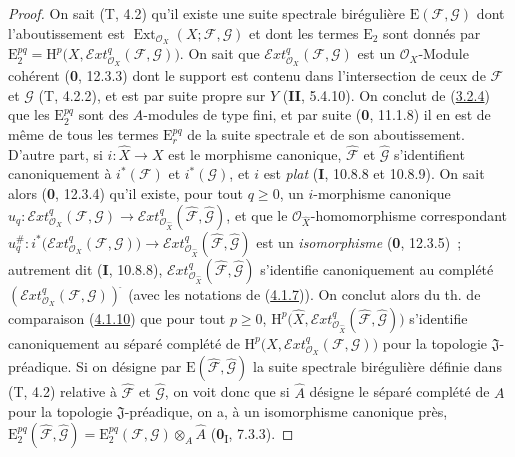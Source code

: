 \begin{proof}
On sait (T, 4.2) qu'il existe une suite spectrale birégulière
$\mathrm E(\mathcal F,\mathcal G)$ dont l'aboutissement est
$\operatorname{Ext}_{\mathcal O_X}(X;\mathcal F,\mathcal G)$ et dont les termes
$\mathrm E_2$ sont donnés par
$\mathrm E_2^{pq}=\mathrm H^p\bigl(X,
\mathcal{E}\!xt^q_{\mathcal O_X}(\mathcal F,\mathcal G)\bigr)$.
On sait que $\mathcal{E}\!xt^q_{\mathcal O_X}(\mathcal F,\mathcal G)$ est un
$\mathcal O_X$-Module cohérent (\textbf{0}, 12.3.3) dont le support est contenu dans
l'intersection de ceux de $\mathcal F$ et $\mathcal G$ (T, 4.2.2), et est
par suite propre sur $Y$ (\textbf{II}, 5.4.10). On conclut de
(\hyperref[III.3.2.4-fr]{3.2.4}) que les $\mathrm E_2^{pq}$ sont des
$A$-modules de type fini, et par suite (\textbf{0}, 11.1.8) il en est de même de tous
les termes $\mathrm E_r^{pq}$ de la suite spectrale et de son aboutissement.
D'autre part, si $i:\widehat X\to X$ est le morphisme canonique,
$\widehat{\mathcal F}$ et $\widehat{\mathcal G}$ s'identifient canoniquement
à $i^*(\mathcal F)$ et $i^*(\mathcal G)$, et $i$ est \emph{plat} (\textbf{I}, 10.8.8 et
10.8.9). On sait alors (\textbf{0}, 12.3.4) qu'il existe, pour tout $q\geq0$, un
$i$-morphisme canonique
$u_q:\mathcal{E}\!xt^q_{\mathcal O_X}(\mathcal F,\mathcal G)
\longrightarrow
\mathcal{E}\!xt^q_{\mathcal O_{\widehat X}}
(\widehat{\mathcal F},\widehat{\mathcal G})$,
et que le $\mathcal O_{\widehat X}$-homomorphisme correspondant
$u_q^\#:i^*\bigl(\mathcal{E}\!xt^q_{\mathcal O_X}(\mathcal F,\mathcal G)\bigr)
\longrightarrow
\mathcal{E}\!xt^q_{\mathcal O_{\widehat X}}
(\widehat{\mathcal F},\widehat{\mathcal G})$
est un \emph{isomorphisme} (\textbf{0}, 12.3.5)~; autrement dit (\textbf{I}, 10.8.8),
$\mathcal{E}\!xt^q_{\mathcal O_{\widehat X}}
(\widehat{\mathcal F},\widehat{\mathcal G})$ s'identifie canoniquement au
complété $(\mathcal{E}\!xt^q_{\mathcal O_X}(\mathcal F,\mathcal G))^{\widehat{\,}}$ (avec les
notations de (\hyperref[III.4.1.7-fr]{4.1.7})). On conclut alors du th. de
comparaison (\hyperref[III.4.1.10-fr]{4.1.10}) que pour tout $p\geq0$,
$\mathrm H^p\bigl(\widehat X,
\mathcal{E}\!xt^q_{\mathcal O_{\widehat X}}
(\widehat{\mathcal F},\widehat{\mathcal G})\bigr)$
s'identifie canoniquement au séparé complété
de
$\mathrm H^p\bigl(X,\mathcal{E}\!xt^q_{\mathcal O_X}
(\mathcal F,\mathcal G)\bigr)$ pour la topologie $\mathfrak J$-préadique.
Si on désigne par $\mathrm E(\widehat{\mathcal F},
\widehat{\mathcal G})$ la suite spectrale birégulière définie dans (T, 4.2)
relative à $\widehat{\mathcal F}$ et $\widehat{\mathcal G}$, on voit donc que
si $\widehat A$ désigne le séparé complété de $A$ pour la topologie
$\mathfrak J$-préadique, on a, à un isomorphisme canonique près,
$\mathrm E_2^{pq}(\widehat{\mathcal F},\widehat{\mathcal G})
=\mathrm E_2^{pq}(\mathcal F,\mathcal G)\otimes_A\widehat A$
(\textbf{0}\textsubscript{I}, 7.3.3).


\end{proof}

